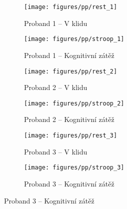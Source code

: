 \begin{figure}[H]
    \centering
    \begin{subfigure}{0.45\textwidth}
        \centering
        \texttt{[image: figures/pp/rest\_1]}
        \caption{Proband 1 -- V klidu}
    \end{subfigure}
    \hspace{12pt}
    \begin{subfigure}{0.45\textwidth}
        \centering
        \texttt{[image: figures/pp/stroop\_1]}
        \caption{Proband 1 -- Kognitivní zátěž}
    \end{subfigure}
    \par\bigskip
    \begin{subfigure}{0.45\textwidth}
        \centering
        \texttt{[image: figures/pp/rest\_2]}
        \caption{Proband 2 -- V klidu}
    \end{subfigure}
    \hspace{12pt}
    \begin{subfigure}{0.45\textwidth}
        \centering
        \texttt{[image: figures/pp/stroop\_2]}
        \caption{Proband 2 -- Kognitivní zátěž}
    \end{subfigure}
    \par\bigskip
    \begin{subfigure}{0.45\textwidth}
        \centering
        \texttt{[image: figures/pp/rest\_3]}
        \caption{Proband 3 -- V klidu}
    \end{subfigure}
    \hspace{12pt}
    \begin{subfigure}{0.45\textwidth}
        \centering
        \texttt{[image: figures/pp/stroop\_3]}
        \caption{Proband 3 -- Kognitivní zátěž}
    \end{subfigure}
\end{figure}
